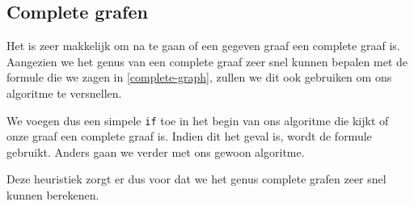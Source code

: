 \documentclass{article}
\begin{document}
\subsection{Complete grafen}
Het is zeer makkelijk om na te gaan of een gegeven graaf een complete graaf is.
Aangezien we het genus van een complete graaf zeer snel kunnen bepalen met de
formule die we zagen in \ref{complete-graph}, zullen we dit ook gebruiken om
ons algoritme te versnellen.
\newline

We voegen dus een simpele \verb#if# toe in het begin van ons algoritme die kijkt
of onze graaf een complete graaf is. Indien dit het geval is, wordt de formule
gebruikt. Anders gaan we verder met ons gewoon algoritme.
\newline

Deze heuristiek zorgt er dus voor dat we het genus complete grafen zeer snel 
kunnen berekenen.
\end{document}
